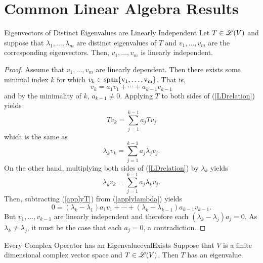 \documentclass[../AlgebraQualSolutions.tex]{subfiles}
\begin{document}
\section{Common Linear Algebra Results}

\begin{prop}{Eigenvectors of Distinct Eigenvalues are Linearly Independent}{}
    Let $T \in \mathscr{L}(V)$ and suppose that $\lambda_1,\ldots, \lambda_m$ are distinct eigenvalues of $T$ and $v_1,\ldots,v_m$ are the corresponding eigenvectors. Then, $v_1,\ldots,v_m$ is linearly independent.
\end{prop}

\begin{proof}
    Assume that $v_1,\ldots, v_m$ are linearly dependent. Then there exists some minimal index $k$ for which $v_k \in \rm{span}\{v_1,\ldots,v_m\}$. That is,
        \begin{equation} v_k = a_1v_1 + \cdots + a_{k-1}v_{k-1} \label{LDrelation}\end{equation}
    and by the minimality of $k$, $a_{k-1} \neq 0$. Applying $T$ to both sides of (\ref{LDrelation}) yields
        \begin{equation} Tv_k = \sum_{j=1}^{k-1} a_jTv_j\end{equation}
    which is the same as
        \begin{equation} \lambda_k v_k = \sum_{j=1}^{k-1} a_j\lambda_jv_j\label{applyT}.\end{equation}
    On the other hand, multiplying both sides of (\ref{LDrelation}) by $\lambda_k$ yields
        \begin{equation} \lambda_k v_k = \sum_{j=1}^{k-1} a_j\lambda_kv_j\label{applylambda}.\end{equation}
    Then, subtracting (\ref{applyT}) from (\ref{applylambda}) yields
        \[0 = (\lambda_k - \lambda_1)a_1 v_1 + \cdots + (\lambda_k - \lambda_{k-1})a_{k-1}v_{k-1}.\]
    But $v_1,\ldots,v_{k-1}$ are linearly independent and therefore each $(\lambda_k - \lambda_j)a_j = 0$. As $\lambda_k \neq \lambda_j$, it must be the case that each $a_j = 0$, a contradiction.
\end{proof}

\begin{prop}{Every Complex Operator has an Eigenvalue}{evalExists}
    Suppose that $V$ is a finite dimensional complex vector space and $T \in \mathscr{L}(V)$. Then $T$ has an eigenvalue.
\end{prop}
\end{document}
